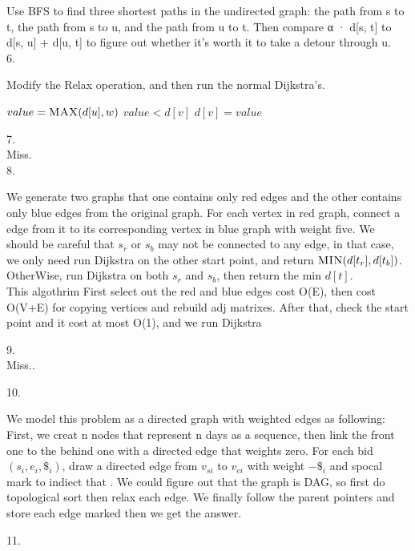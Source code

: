 \documentclass[12pt,twoside]{article}
\begin{document}
Use BFS to find three shortest paths in the undirected graph: the path from s to t, the
path from s to u, and the path from u to t. Then compare α · d[s, t] to d[s, u] + d[u, t] to figure out
whether it’s worth it to take a detour through u.\\
6.

Modify the Relax operation, and then run the normal Dijkstra's.
\begin{codebox}
\li $value=\textnormal{\scshape MAX}(d[u],w)$
\li \If $value < d[v]$ \Do
\li $d[v]=value$ \End
\end{codebox} \newpage

\begin{flushleft}
7.\\
Miss. \\
8.
\end{flushleft}

We generate two graphs that one contains only red edges and the other contains only blue edges from the original graph. For each vertex in red graph, connect a edge from it to its corresponding vertex in blue graph with weight five. We should be careful that $s_r$ or $s_b$ may not be connected to any edge, in that case, we only need run Dijkstra on the other start point, and return $\textnormal{\scshape MIN}(d[t_r],d[t_b])$. OtherWise, run Dijkstra on both $s_r$ and $s_b$, then return the min $d[t]$.\\
This algothrim First select out the red and blue edges cost O(E), then cost O(V+E) for copying vertices and rebuild adj matrixes. After that, check the start point and it cost at most O(1), and we run Dijkstra 
\begin{flushleft}
9.\\
Miss.. \\
\end{flushleft}
10.

We model this problem as a directed graph with weighted edges as following:\\First, we creat n nodes that represent n days as a sequence, then link the front one to the behind one with a directed edge that weights zero. For each bid$(s_i,e_i,\$_i)$, draw a directed edge from $v_{si}$ to $v_{ei}$ with weight $-\$_i$ and spocal mark to indiect that . We could figure out that the graph is DAG, so first do topological sort then relax each edge. We finally follow the parent pointers and store each edge marked then we get the answer.

11.
\end{document}
